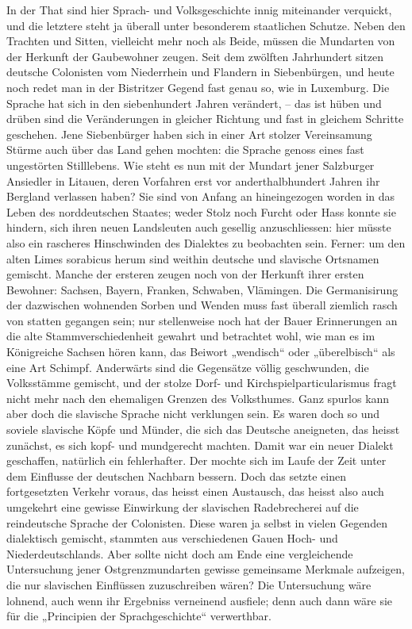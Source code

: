{In der That sind hier Sprach- und Volksgeschichte innig miteinander verquickt, und die letztere steht ja überall unter besonderem staatlichen Schutze. Neben den Trachten und Sitten, vielleicht mehr noch als Beide, müssen die Mundarten von der Herkunft der Gaubewohner zeugen. Seit dem zwölften Jahrhundert sitzen deutsche Colonisten vom Niederrhein und Flandern in Siebenbürgen, und heute noch redet man in der Bistritzer Gegend fast genau so, wie in Luxemburg. Die Sprache hat sich in den siebenhundert Jahren verändert, – das ist  hüben und drüben sind die Veränderungen in gleicher Richtung und fast in gleichem Schritte geschehen. Jene Siebenbürger haben sich in einer Art stolzer Vereinsamung  Stürme auch über das Land gehen mochten: die Sprache genoss eines fast ungestörten Still\-\label{sp.287}lebens. Wie steht es nun mit der Mundart jener Salzburger Ansiedler in Litauen, deren Vorfahren erst vor anderthalbhundert Jahren ihr Bergland verlassen haben? Sie sind von Anfang an hineingezogen worden in das Leben des norddeutschen Staates; weder Stolz noch Furcht oder Hass konnte sie hindern, sich ihren neuen Landsleuten auch gesellig anzuschliessen: hier müsste also ein rascheres Hinschwinden des Dialektes zu beobachten sein. Ferner: um den alten Limes sorabicus herum sind weithin deutsche und slavische Ortsnamen gemischt. Manche der ersteren zeugen noch von der Herkunft ihrer ersten Bewohner: Sachsen, Bayern, Franken, Schwaben, Vlämingen. Die Germanisirung der dazwischen \label{fp.281} wohnenden Sorben und Wenden muss fast überall ziemlich rasch von statten gegangen sein; nur stellenweise noch hat der Bauer Erinnerungen an die alte Stammverschiedenheit gewahrt und betrachtet wohl, wie man es im Königreiche Sachsen hören kann, das Beiwort „wendisch“ oder „überelbisch“ als eine Art Schimpf. Anderwärts sind die Gegensätze völlig geschwunden, die Volksstämme gemischt, und der stolze Dorf- und Kirchspielparticularismus fragt nicht mehr nach den ehemaligen Grenzen des Volksthumes. Ganz spurlos kann aber doch die slavische Sprache nicht verklungen sein. Es waren doch so und soviele slavische Köpfe und Münder, die sich das Deutsche aneigneten, das heisst zunächst, es sich kopf- und mundgerecht machten. Damit war ein neuer Dialekt geschaffen, natürlich ein fehlerhafter. Der mochte sich im Laufe der Zeit unter dem Einflusse der deutschen Nachbarn bessern. Doch das setzte einen fortgesetzten Verkehr voraus, das heisst einen Austausch, das heisst also auch umgekehrt eine gewisse Einwirkung der slavischen Radebrecherei auf die reindeutsche Sprache der Colonisten. Diese waren ja selbst in vielen Gegenden dialektisch gemischt, stammten aus verschiedenen Gauen Hoch- und Niederdeutschlands. Aber sollte nicht doch am Ende eine vergleichende Untersuchung jener Ostgrenzmundarten gewisse gemeinsame Merkmale aufzeigen, die nur slavischen Einflüssen zuzuschreiben wären? Die Untersuchung wäre lohnend, auch wenn ihr Ergebniss verneinend ausfiele; denn auch dann wäre sie für die „Principien der Sprachgeschichte“ verwerthbar.

}
